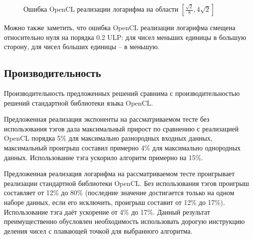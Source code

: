\begin{figure}[hbt]
  \centering
  \caption{Ошибка OpenCL реализации логарифма на области $[\frac{\sqrt{2}}{8}, 4\sqrt{2}]$}
  \label{plot:ocl_log:small}
\end{figure}

Можно также заметить, что ошибка OpenCL реализации логарифма смещена относительно нуля на порядка 0.2 ULP: для чисел меньших единицы в большую сторону, для чисел больших единицы -- в меньшую.

\subsection{Производительность}

Производительность предложенных решений сравнима с производительностью решений стандартной библиотеки языка OpenCL.

Предложенная реализация экспоненты на рассматриваемом тесте без использования тэгов дала максимальный прирост по сравнению с реализацией OpenCL порядка 5\% для максимально разнородных входных данных, максимальный проигрыш составил примерно 4\% для максимально однородных данных.
Использование тэга ускорило алгоритм примерно на 15\%.

Предложенная реализация логарифма на рассматриваемом тесте проигрывает реализации стандартной библиотеки OpenCL.
Без использования тэгов проигрыш составляет от 12\% до 80\% (последние значение достигается только на одном наборе данных, если его исключить, проигрыш составит от 12\% до 17\%).
Использование тэга даёт ускорение от 4\% до 17\%.
Данный результат преимущественно обусловлен необходимость использовать дорогую инструкцию деления чисел с плавающей точкой для выбранного алгоритма.

